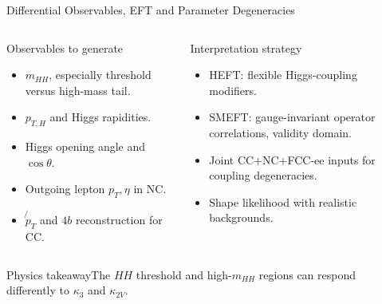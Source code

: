 \documentclass[aspectratio=1610,english]{beamer}
\newcommand{\src}[1]{\vfill{\par\color{black!65}\fontsize{6.4}{7.4}\selectfont\emph{Source:} #1\par}}
\newcommand{\key}[1]{\begin{alertblock}{Physics takeaway}\small  #1\end{alertblock}}
\begin{document}
\begin{frame}[t]{Differential Observables, EFT and Parameter Degeneracies}
\small

\begin{columns}%
\begin{block}{Observables to generate}
\begin{itemize}
\justifying 
\item $m_{HH}$, especially threshold versus high-mass tail.
\item $p_{T,H}$ and Higgs rapidities.
\item Higgs opening angle and $\cos\theta$.
\item Outgoing lepton $p_T,\eta$ in NC.
\item $\not{p}_T$ and $4b$ reconstruction for CC.
\end{itemize}\end{block}
\begin{alertblock}{Interpretation strategy}
\begin{itemize}
\justifying 
\item HEFT: flexible Higgs-coupling modifiers.
\item SMEFT: gauge-invariant operator correlations, validity domain.
\item Joint CC+NC+FCC-ee inputs for coupling degeneracies.
\item Shape likelihood with realistic backgrounds.
\end{itemize}\end{alertblock}
\end{columns}

\key{The $HH$ threshold and high-$m_{HH}$ regions can respond differently to $\kappa_3$ and $\kappa_{2V}$.}

\end{frame}
\end{document}
